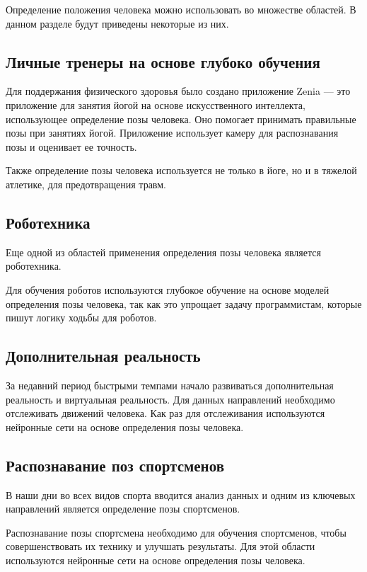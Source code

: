 Определение положения человека можно использовать во множестве областей. В данном разделе будут приведены некоторые из них.

\subsection{Личные тренеры на основе глубоко обучения}

Для поддержания физического здоровья было создано приложение Zenia \cite{Zenia} --- это приложение для занятия йогой на основе искусственного интеллекта, использующее определение позы человека.
Оно помогает принимать правильные позы при занятиях йогой.
Приложение использует камеру для распознавания позы и оценивает ее точность.

Также определение позы человека используется не только в йоге, но и в тяжелой атлетике, для предотвращения травм.

\subsection{Роботехника}

Еще одной из областей применения определения позы человека является роботехника.

Для обучения роботов используются глубокое обучение на основе моделей определения позы человека, так как это упрощает задачу программистам, которые пишут логику ходьбы для роботов. 

\subsection{Дополнительная реальность}

За недавний период быстрыми темпами начало развиваться дополнительная реальность и виртуальная реальность. Для данных направлений необходимо отслеживать движений человека. Как раз для отслеживания используются нейронные сети на основе определения позы человека.

\subsection{Распознавание поз спортсменов}

В наши дни во всех видов спорта вводится анализ данных и одним из ключевых направлений является определение позы спортсменов.

Распознавание позы спортсмена необходимо для обучения спортсменов, чтобы совершенствовать их технику и улучшать результаты. Для этой области используются нейронные сети на основе определения позы человека.